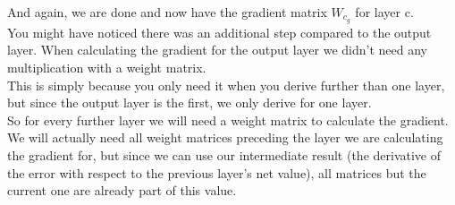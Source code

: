 \documentclass[11pt, halfparskip]{article}
\begin{document}
    And again, we are done and now have the gradient matrix $W_{c_g}$ for layer c.\\
    You might have noticed there was an additional step compared to the output layer. When calculating the gradient for the output layer we didn't need any multiplication with a
    weight matrix.\\
    This is simply because you only need it when you derive further than one layer, but since the output layer is the first, we only derive for one layer.\\
    So for every further layer we will need a weight matrix to calculate the gradient. We will actually need all weight matrices preceding the layer we are calculating the gradient for, but
    since we can use our intermediate result (the derivative of the error with respect to the previous layer's net value), all matrices but the current one are already part of this value.
    
\end{document}

